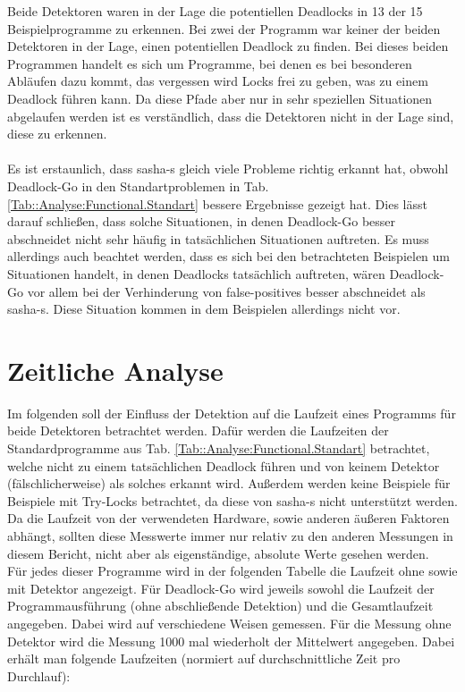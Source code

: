 Beide Detektoren waren in der Lage die potentiellen Deadlocks in 13 der 15 
Beispielprogramme zu erkennen. Bei zwei der Programm war keiner der beiden Detektoren 
in der Lage, einen potentiellen Deadlock zu finden. Bei dieses beiden 
Programmen handelt es sich um Programme, bei denen es bei besonderen 
Abläufen dazu kommt, das vergessen wird Locks frei zu geben, was zu einem Deadlock 
führen kann. Da diese Pfade aber nur in sehr speziellen Situationen abgelaufen 
werden ist es verständlich, dass die Detektoren nicht in der Lage sind, diese 
zu erkennen.\\\\
Es ist erstaunlich, dass sasha-s gleich viele Probleme richtig erkannt hat, obwohl 
Deadlock-Go in den Standartproblemen in Tab. \ref{Tab::Analyse:Functional.Standart}
bessere Ergebnisse gezeigt hat. Dies lässt darauf schließen, dass solche 
Situationen, in denen Deadlock-Go besser abschneidet nicht sehr häufig 
in tatsächlichen Situationen auftreten. Es muss allerdings auch beachtet werden, 
dass es sich bei den betrachteten Beispielen um Situationen handelt, in denen
Deadlocks tatsächlich auftreten, wären Deadlock-Go vor allem bei der 
Verhinderung von false-positives besser abschneidet als sasha-s. Diese 
Situation kommen in dem Beispielen allerdings nicht vor.


\section{Zeitliche Analyse}
Im folgenden soll der Einfluss der Detektion auf die Laufzeit eines Programms 
für beide Detektoren betrachtet werden. Dafür werden die Laufzeiten der 
Standardprogramme aus Tab. \ref{Tab::Analyse:Functional.Standart} betrachtet, 
welche nicht zu einem tatsächlichen Deadlock führen und von keinem Detektor 
(fälschlicherweise) als solches erkannt wird. Außerdem werden keine Beispiele 
für Beispiele mit Try-Locks betrachtet, da diese von sasha-s nicht unterstützt werden.\\ 
Da die Laufzeit von der verwendeten Hardware, sowie anderen äußeren Faktoren 
abhängt, sollten diese Messwerte immer nur relativ zu den anderen Messungen 
in diesem Bericht, nicht aber als eigenständige, absolute Werte gesehen werden.\\ 
Für jedes dieser Programme 
wird in der folgenden Tabelle die Laufzeit ohne sowie mit Detektor angezeigt.
Für Deadlock-Go wird jeweils sowohl die Laufzeit der Programmausführung (ohne 
abschließende Detektion) und die Gesamtlaufzeit angegeben. Dabei wird auf verschiedene 
Weisen gemessen. Für die Messung ohne Detektor wird die Messung 1000 mal wiederholt
der Mittelwert angegeben. Dabei erhält man folgende Laufzeiten 
(normiert auf durchschnittliche Zeit pro Durchlauf):


